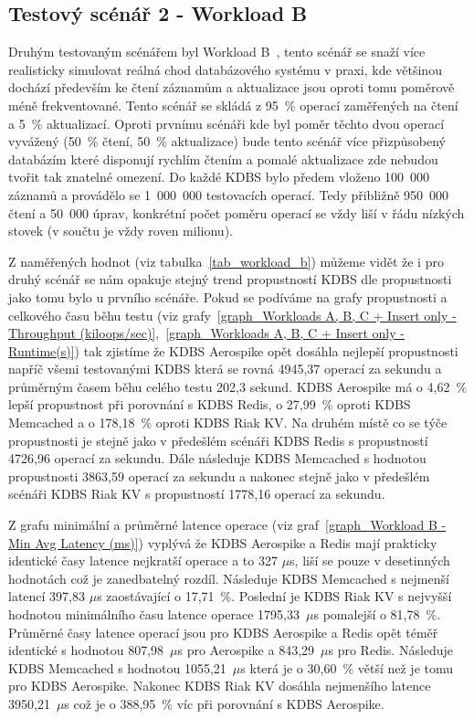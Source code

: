 \documentclass[czech,master,dept460,male,csharp,cpdeclaration]{diploma}
\begin{document}
	\subsection{Testový scénář 2 - Workload B}
	
	Druhým testovaným scénářem byl Workload B~\cite{workloads}, tento scénář se snaží více realisticky simulovat reálná chod databázového systému v praxi, kde většinou dochází především ke čtení záznamům a aktualizace jsou oproti tomu poměrově méně frekventované. Tento scénář se skládá z 95~\% operací zaměřených na čtení a 5~\% aktualizací. Oproti prvnímu scénáři kde byl poměr těchto dvou operací vyvážený (50~\% čtení, 50~\% aktualizace) bude tento scénář více přizpůsobený databázím které disponují rychlím čtením a pomalé aktualizace zde nebudou tvořit tak znatelné omezení. Do každé KDBS bylo předem vloženo 100~000 záznamů a provádělo se 1~000~000 testovacích operací. Tedy přibližně 950~000 čtení a 50~000 úprav, konkrétní počet poměru operací se vždy liší v řádu nízkých stovek (v součtu je vždy roven milionu).
	
	Z naměřených hodnot (viz tabulka~\ref{tab_workload_b}) můžeme vidět že i pro druhý scénář se nám opakuje stejný trend propustností KDBS dle propustnosti jako tomu bylo u prvního scénáře. Pokud se podíváme na grafy propustnosti a celkového času běhu testu (viz grafy~\ref{graph_Workloads A, B, C + Insert only - Throughput (kiloops/sec)},~\ref{graph_Workloads A, B, C + Insert only - Runtime(s)}) tak zjistíme že KDBS Aerospike opět dosáhla nejlepší propustnosti napříč všemi testovanými KDBS která se rovná 4945,37 operací za sekundu a průměrným časem běhu celého testu 202,3 sekund. KDBS Aerospike má o 4,62~\% lepší propustnost při porovnání s KDBS Redis, o 27,99~\% oproti KDBS Memcached a o 178,18~\% oproti KDBS Riak KV. Na druhém místě co se týče propustnosti je stejně jako v předešlém scénáři KDBS Redis s propustností 4726,96 operací za sekundu. Dále následuje KDBS Memcached s hodnotou propustnosti 3863,59 operací za sekundu a nakonec stejně jako v předešlém scénáři KDBS Riak KV s propustností 1778,16 operací za sekundu.
	
	Z grafu minimální a průměrné latence operace (viz graf~\ref{graph_Workload B - Min Avg Latency (ms)}) vyplývá že KDBS Aerospike a Redis mají prakticky identické časy latence nejkratší operace a to 327 $\mu$s, liší se pouze v desetinných hodnotách což je zanedbatelný rozdíl. Následuje KDBS Memcached s nejmenší latencí 397,83 $\mu$s zaostávající o 17,71~\%. Poslední je KDBS Riak KV s nejvyšší hodnotou minimálního času latence operace 1795,33~$\mu$s pomalejší o 81,78~\%. Průměrné časy latence operací jsou pro KDBS Aerospike a Redis opět téměř identické s hodnotou 807,98~$\mu$s pro Aerospike a 843,29~$\mu$s pro Redis. Následuje KDBS Memcached s hodnotou 1055,21~$\mu$s která je o 30,60~\% větší než je tomu pro KDBS Aerospike. Nakonec KDBS Riak KV dosáhla nejmenšího latence 3950,21~$\mu$s což je o 388,95~\% víc při porovnání s KDBS Aerospike.
	
\end{document}

